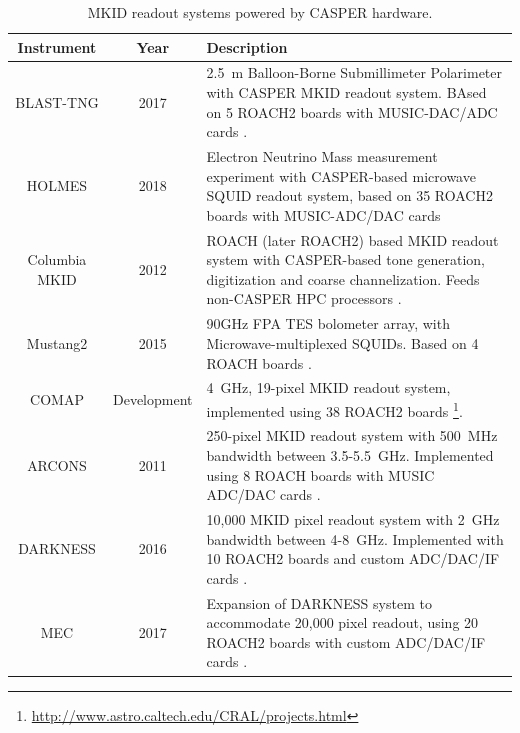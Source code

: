 \documentclass{ws-jai}
\begin{document}
\begin{table}
\label{table:casper-instruments-mkid}
\caption{MKID readout systems powered by CASPER hardware.}
\centering
\begin{tabular}{ccp{10cm}}
  Instrument & Year & Description \\
  \hline
  BLAST-TNG        & 2017 &  2.5~m Balloon-Borne Submillimeter Polarimeter with CASPER MKID readout system. BAsed on 5 ROACH2 boards with MUSIC-DAC/ADC cards \citep{galitzki2014balloon}. \\
  HOLMES           & 2018 & Electron Neutrino Mass measurement experiment with CASPER-based microwave SQUID readout system, based on 35 ROACH2 boards with MUSIC-ADC/DAC cards \cite{Alpert2015, Ferri2016179.} \\
  Columbia MKID    & 2012 & ROACH (later ROACH2) based MKID readout system with CASPER-based tone generation, digitization and coarse channelization. Feeds non-CASPER HPC processors \citep{mccarrick_2014}. \\
  Mustang2         & 2015 & 90GHz FPA TES bolometer array, with Microwave-multiplexed SQUIDs. Based on 4 ROACH boards \citep{2016JLTP..184..460S, 2014JLTP..176..808D}.  \\
  COMAP            & Development & 4~GHz, 19-pixel MKID readout system, implemented using 38 ROACH2 boards \footnote{\url{http://www.astro.caltech.edu/CRAL/projects.html}}. \\
  ARCONS           & 2011 & 250-pixel MKID readout system with 500~MHz bandwidth between 3.5-5.5~GHz. Implemented using 8 ROACH boards with MUSIC ADC/DAC cards \citep{10.1086/674013}. \\
  DARKNESS         & 2016 & 10,000 MKID pixel readout system with 2~GHz bandwidth between 4-8~GHz. Implemented with 10 ROACH2 boards and custom ADC/DAC/IF cards \citep{in prep}. \\
  MEC              & 2017 & Expansion of DARKNESS system to accommodate 20,000 pixel readout, using 20 ROACH2 boards with custom ADC/DAC/IF cards \citep{in prep}. \\
\end{tabular}
\end{table}
\end{document}
